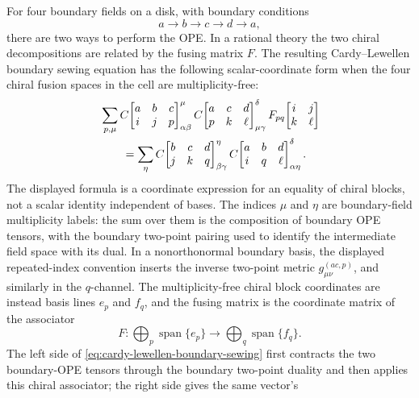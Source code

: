 For four boundary fields on a disk, with boundary conditions
\[
  a\longrightarrow b\longrightarrow c\longrightarrow d
  \longrightarrow a ,
\]
there are two ways to perform the OPE.  In a rational theory the two chiral
decompositions are related by the fusing matrix \(F\).  The resulting
Cardy--Lewellen boundary sewing equation has the following scalar-coordinate
form when the four chiral fusion spaces in the cell are multiplicity-free:
\begin{align}
  &\sum_{p,\mu}
  C\!\begin{bmatrix} a&b&c\\ i&j&p \end{bmatrix}_{\alpha\beta}^{\mu}
  C\!\begin{bmatrix} a&c&d\\ p&k&\ell \end{bmatrix}_{\mu\gamma}^{\delta}
  F_{pq}\!\begin{bmatrix} i&j\\ k&\ell \end{bmatrix}
  \notag\\
  &\qquad =
  \sum_{\eta}
  C\!\begin{bmatrix} b&c&d\\ j&k&q \end{bmatrix}_{\beta\gamma}^{\eta}
  C\!\begin{bmatrix} a&b&d\\ i&q&\ell \end{bmatrix}_{\alpha\eta}^{\delta}.
  \label{eq:cardy-lewellen-boundary-sewing}
\end{align}
The displayed formula is a coordinate expression for an equality of chiral
blocks, not a scalar identity independent of bases.  The indices \(\mu\) and
\(\eta\) are boundary-field multiplicity labels: the sum over them is the
composition of boundary OPE tensors, with the boundary two-point pairing used
to identify the intermediate field space with its dual.  In a nonorthonormal
boundary basis, the displayed repeated-index convention inserts the inverse
two-point metric \(g^{(ac,p)}_{\mu\nu}\), and similarly in the \(q\)-channel.
The multiplicity-free chiral block coordinates are instead basis lines
\(e_p\) and \(f_q\), and the fusing matrix is the coordinate matrix of the
associator
\[
  F:\bigoplus_{p}\operatorname{span}\{e_p\}
  \longrightarrow
  \bigoplus_{q}\operatorname{span}\{f_q\}.
\]
The left side of \eqref{eq:cardy-lewellen-boundary-sewing} first contracts the
two boundary-OPE tensors through the boundary two-point duality and then
applies this chiral associator; the right side gives the same vector's
